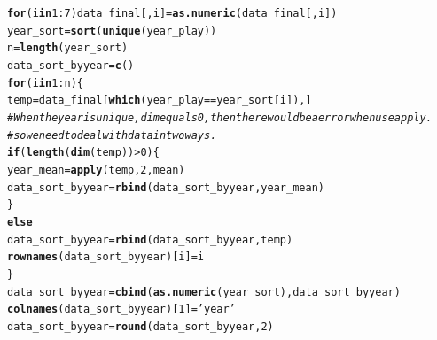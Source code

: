 \documentclass{article}\usepackage[]{graphicx}\usepackage[]{color}
\makeatletter
\newcommand{\hlnum}[1]{\textcolor[rgb]{0.686,0.059,0.569}{#1}}%
\newcommand{\hlstr}[1]{\textcolor[rgb]{0.192,0.494,0.8}{#1}}%
\newcommand{\hlcom}[1]{\textcolor[rgb]{0.678,0.584,0.686}{\textit{#1}}}%
\newcommand{\hlopt}[1]{\textcolor[rgb]{0,0,0}{#1}}%
\newcommand{\hlstd}[1]{\textcolor[rgb]{0.345,0.345,0.345}{#1}}%
\newcommand{\hlkwa}[1]{\textcolor[rgb]{0.161,0.373,0.58}{\textbf{#1}}}%
\newcommand{\hlkwb}[1]{\textcolor[rgb]{0.69,0.353,0.396}{#1}}%
\newcommand{\hlkwd}[1]{\textcolor[rgb]{0.737,0.353,0.396}{\textbf{#1}}}%
\newenvironment{kframe}{%
 \def\at@end@of@kframe{}%
 \ifinner\ifhmode%
  \def\at@end@of@kframe{\end{minipage}}%
  \begin{minipage}{\columnwidth}%
 \fi\fi%
 \def\FrameCommand##1{\hskip\@totalleftmargin \hskip-\fboxsep
 \colorbox{shadecolor}{##1}\hskip-\fboxsep
     \hskip-\linewidth \hskip-\@totalleftmargin \hskip\columnwidth}%
 \MakeFramed {\advance\hsize-\width
   \@totalleftmargin\z@ \linewidth\hsize
   \@setminipage}}%
 {\par\unskip\endMakeFramed%
 \at@end@of@kframe}
\newenvironment{knitrout}{}{} %
\makeatother
\begin{document}
\begin{knitrout}
\color{fgcolor}\begin{kframe}
\begin{alltt}
\hlkwa{for}\hlstd{(i} \hlkwa{in} \hlnum{1}\hlopt{:}\hlnum{7}\hlstd{) data_final[,i]}\hlkwb{=}\hlkwd{as.numeric}\hlstd{(data_final[,i])}
\hlstd{year_sort}\hlkwb{=}\hlkwd{sort}\hlstd{(}\hlkwd{unique}\hlstd{(year_play))}
\hlstd{n}\hlkwb{=}\hlkwd{length}\hlstd{(year_sort)}
\hlstd{data_sort_byyear}\hlkwb{=}\hlkwd{c}\hlstd{()}
\hlkwa{for}\hlstd{(i} \hlkwa{in} \hlnum{1}\hlopt{:}\hlstd{n)\{}
  \hlstd{temp}\hlkwb{=}\hlstd{data_final[}\hlkwd{which}\hlstd{(year_play}\hlopt{==}\hlstd{year_sort[i]),]}
\hlcom{# When the year is unique, dim equals 0, then there would be a error when use apply. }
\hlcom{# so we need to deal with data in two ways.}
  \hlkwa{if}\hlstd{(}\hlkwd{length}\hlstd{(}\hlkwd{dim}\hlstd{(temp))}\hlopt{>}\hlnum{0}\hlstd{)\{}
  \hlstd{year_mean}\hlkwb{=}\hlkwd{apply}\hlstd{(temp,}\hlnum{2}\hlstd{,mean)}
  \hlstd{data_sort_byyear}\hlkwb{=}\hlkwd{rbind}\hlstd{(data_sort_byyear,year_mean)}
  \hlstd{\}}
  \hlkwa{else}
  \hlstd{data_sort_byyear}\hlkwb{=}\hlkwd{rbind}\hlstd{(data_sort_byyear,temp)}
  \hlkwd{rownames}\hlstd{(data_sort_byyear)[i]}\hlkwb{=}\hlstd{i}
\hlstd{\}}
\hlstd{data_sort_byyear}\hlkwb{=}\hlkwd{cbind}\hlstd{(}\hlkwd{as.numeric}\hlstd{(year_sort),data_sort_byyear)}
\hlkwd{colnames}\hlstd{(data_sort_byyear)[}\hlnum{1}\hlstd{]}\hlkwb{=}\hlstr{'year'}
\hlstd{data_sort_byyear}\hlkwb{=}\hlkwd{round}\hlstd{(data_sort_byyear,}\hlnum{2}\hlstd{)}
\end{alltt}
\end{kframe}
\end{knitrout}
\end{document}
